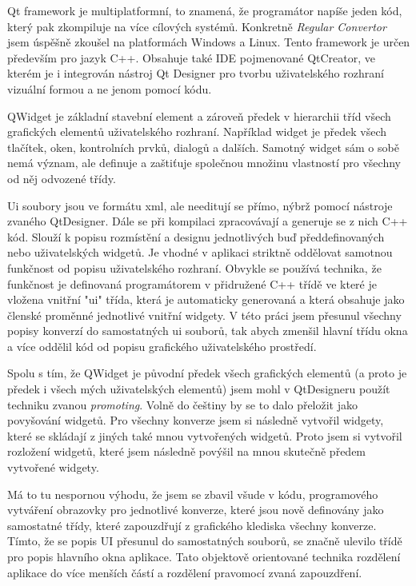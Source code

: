 
Qt framework je multiplatformní, to znamená, že programátor napíše jeden kód, který pak zkompiluje na více cílových systémů. Konkretně \textit{Regular Convertor} jsem úspěšně zkoušel na platformách Windows a Linux. Tento framework je určen především pro jazyk C++. Obsahuje také IDE pojmenované QtCreator, ve kterém je i integrován nástroj Qt Designer pro tvorbu uživatelského rozhraní vizuální formou a ne jenom pomocí kódu. \cite{QT} 


QWidget je základní stavební element a zároveň předek v hierarchii tříd všech grafických elementů uživatelského rozhraní. Například widget je předek všech tlačítek, oken, kontrolních prvků, dialogů a dalších. Samotný widget sám o sobě nemá význam, ale definuje a zaštiťuje společnou množinu vlastností pro všechny od něj odvozené třídy.


Ui soubory jsou ve formátu xml, ale needitují se přímo, nýbrž pomocí nástroje zvaného QtDesigner. Dále se při kompilaci zpracovávají a generuje se z nich C++ kód. Slouží k popisu rozmístění a designu jednotlivých buď předdefinovaných nebo uživatelských widgetů. Je vhodné v aplikaci striktně oddělovat samotnou funkčnost od popisu uživatelského rozhraní. Obvykle se používá technika, že funkčnost je definovaná programátorem v přidružené C++ třídě ve které je vložena vnitřní "ui" třída, která je automaticky generovaná a která obsahuje jako členské proměnné jednotlivé vnitřní widgety. V této práci jsem přesunul všechny popisy konverzí do samostatných ui souborů, tak abych zmenšil hlavní třídu okna a více oddělil kód od popisu grafického uživatelského prostředí. 


Spolu s tím, že QWidget je původní předek všech grafických elementů (a proto je předek i všech mých uživatelských elementů) jsem mohl v QtDesigneru použít techniku zvanou \textit{promoting}. Volně do češtiny by se to dalo přeložit jako povyšování widgetů. Pro všechny konverze jsem si následně vytvořil widgety, které se skládají z jiných také mnou vytvořených widgetů. Proto jsem si vytvořil rozložení widgetů, které jsem následně povýšil na mnou skutečně předem vytvořené widgety.

Má to tu nespornou výhodu, že jsem se zbavil všude v kódu, programového vytváření obrazovky pro jednotlivé konverze, které jsou nově definovány jako samostatné třídy, které zapouzdřují z grafického klediska všechny konverze. Tímto, že se popis UI přesunul do samostatných souborů, se značně ulevilo třídě pro popis hlavního okna aplikace. Tato objektově orientované technika rozdělení aplikace do více menších částí a rozdělení pravomocí zvaná zapouzdření.

